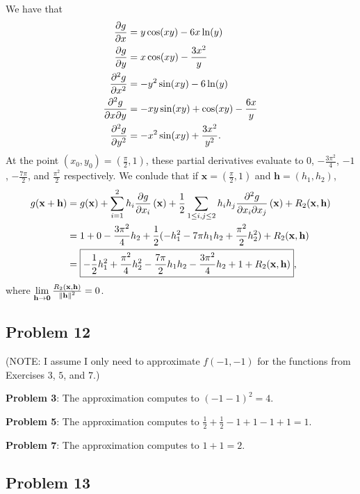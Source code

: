 \documentclass[11pt]{article}
\renewcommand{\vec}[1]{\mathbf{#1}}
\begin{document}
We have that
\begin{align*}
	\pdv{g}{x} &= y \cos(xy) - 6x \ln(y) \\
	\pdv{g}{y} &= x \cos(xy) - \frac{3x^{2}}{y} \\
	\pdv[2]{g}{x} &= - y^{2} \sin(xy) - 6 \ln(y) \\ 
	\pdv[2]{g}{x}{y} &= -xy \sin(xy) + \cos(xy) - \frac{6x}{y} \\
	\pdv[2]{g}{y} &= -x^{2} \sin(xy) + \frac{3x^{2}}{y^{2}}.
\end{align*}
At the point $(x_{0}, y_{0}) = (\tfrac{\pi}{2}, 1)$, these partial derivatives evaluate to $0$, $-\tfrac{3 \pi^{2}}{4}$, $-1$, $-\tfrac{7 \pi}{2}$, and $\tfrac{\pi^{2}}{2}$ respectively. We conlude that if $\vec{x} = (\tfrac{\pi}{2}, 1)$ and $\vec{h} = (h_{1}, h_{2})$, 
\begin{align*}
	g(\vec{x} + \vec{h}) &= g(\vec{x}) + \sum_{i = 1}^{2} h_{i} \pdv{g}{x_{i}} \left( \vec{x} \right) + \frac{1}{2} \sum_{1 \le i, j \le 2} h_{i} h_{j} \pdv[2]{g}{x_{i}}{x_{j}} \left( \vec{x} \right) + R_{2}(\vec{x}, \vec{h}) \\
	&= 1 + 0 -\frac{3 \pi^{2}}{4} h_{2} + \frac{1}{2} (-h_{1}^{2} - 7 \pi h_{1}h_{2} + \frac{\pi^{2}}{2}h_{2}^{2}) + R_{2}(\vec{x, \vec{h}}) \\
	&= \boxed{-\frac{1}{2}h_{1}^{2} + \frac{\pi^{2}}{4} h_{2}^{2} - \frac{7\pi}{2} h_{1} h_{2} - \frac{3\pi^{2}}{4} h_{2} + 1 + R_{2}(\vec{x}, \vec{h})}, 
\end{align*}
where $\lim\limits_{\vec{h} \to \vec{0}} \frac{R_{2}(\vec{x}, \vec{h})}{\norm{\vec{h}}^{2}} = 0$.


\subsection{Problem 12}

(NOTE: I assume I only need to approximate $f(-1, -1)$ for the functions from Exercises $3$, $5$, and $7$.)

\textbf{Problem 3}: The approximation computes to $(-1 - 1)^{2} = \boxed{4}$.

\textbf{Problem 5}: The approximation computes to $\tfrac{1}{2} + \tfrac{1}{2} - 1 + 1 - 1 + 1 = \boxed{1}$.

\textbf{Problem 7}: The approximation computes to $1 + 1 = \boxed{2}$.


\subsection{Problem 13}
\end{document}
